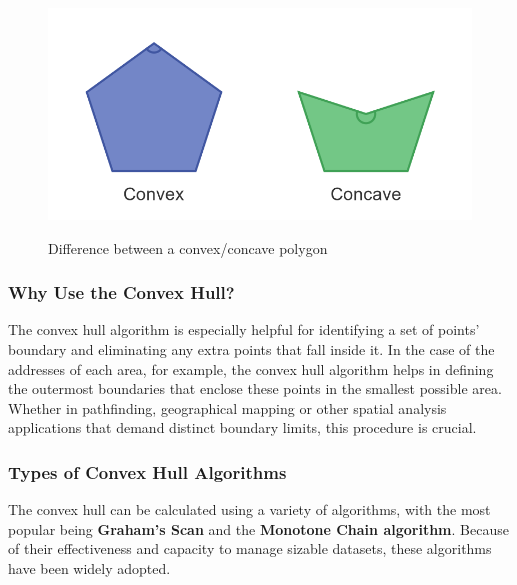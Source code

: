     \begin{figure} [H]
        \centering
        \includegraphics [width=1\textwidth] {images/andreas/areaBorders/convexConcave.png}
        \caption{Difference between a convex/concave polygon}
        \cite{Andi:concaveConvex}
    \end{figure}

    \subsubsection{Why Use the Convex Hull?}
    The convex hull algorithm is especially helpful for identifying a set of points' boundary and eliminating any extra points that fall inside it. In the case of the addresses of each area, for example, the convex hull algorithm helps in defining the outermost boundaries that enclose these points in the smallest possible area. Whether in pathfinding, geographical mapping or other spatial analysis applications that demand distinct boundary limits, this procedure is crucial.

    \subsubsection{Types of Convex Hull Algorithms}
    The convex hull can be calculated using a variety of algorithms, with the most popular being \textbf{Graham's Scan} and the \textbf{Monotone Chain algorithm}. Because of their effectiveness and capacity to manage sizable datasets, these algorithms have been widely adopted.

    \blankLine

